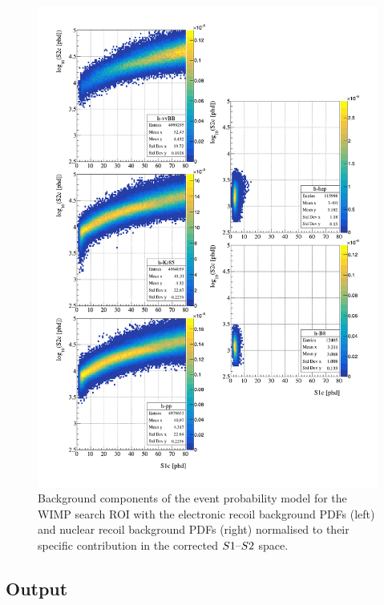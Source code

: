 \begin{figure}[h!]
    \ContinuedFloat 
    \centering
    \includegraphics[scale=0.7]{Chapter_5/Figures/sensitivity_studies/background_pdfs_2.pdf}
    \caption[Background components of the event probability model for the WIMP search ROI with the electronic recoil background PDFs (left) and nuclear recoil background PDFs (right) normalised to their specific contribution in the corrected $S1\mhyphen{}S2$ space.]%
    {Background components of the event probability model for the WIMP search ROI with the electronic recoil background PDFs (left) and nuclear recoil background PDFs (right) normalised to their specific contribution in the corrected $S1\mhyphen{}S2$ space.}
    \label{fig:lz_background_pdfs}
\end{figure}
%

\clearpage

\subsection{Output}
\label{secsec:detector_param}


